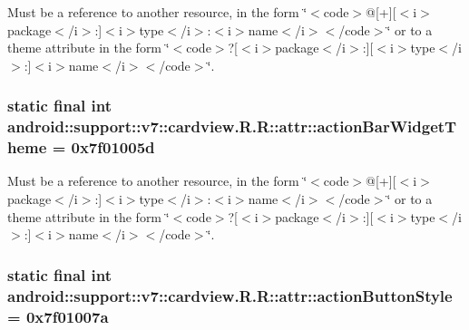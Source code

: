 Must be a reference to another resource, in the form \char`\"{}$<$code$>$@\mbox{[}+\mbox{]}\mbox{[}$<$i$>$package$<$/i$>$:\mbox{]}$<$i$>$type$<$/i$>$:$<$i$>$name$<$/i$>$$<$/code$>$\char`\"{} or to a theme attribute in the form \char`\"{}$<$code$>$?\mbox{[}$<$i$>$package$<$/i$>$:\mbox{]}\mbox{[}$<$i$>$type$<$/i$>$:\mbox{]}$<$i$>$name$<$/i$>$$<$/code$>$\char`\"{}. \hypertarget{classandroid_1_1support_1_1v7_1_1cardview_1_1_r_1_1attr_2e445c2e571511680877e733ec1be802}{
\subsubsection[{actionBarWidgetTheme}]{\setlength{\rightskip}{0pt plus 5cm}static final int android::support::v7::cardview.R.R::attr::actionBarWidgetTheme = 0x7f01005d}}
\label{classandroid_1_1support_1_1v7_1_1cardview_1_1_r_1_1attr_2e445c2e571511680877e733ec1be802}


Must be a reference to another resource, in the form \char`\"{}$<$code$>$@\mbox{[}+\mbox{]}\mbox{[}$<$i$>$package$<$/i$>$:\mbox{]}$<$i$>$type$<$/i$>$:$<$i$>$name$<$/i$>$$<$/code$>$\char`\"{} or to a theme attribute in the form \char`\"{}$<$code$>$?\mbox{[}$<$i$>$package$<$/i$>$:\mbox{]}\mbox{[}$<$i$>$type$<$/i$>$:\mbox{]}$<$i$>$name$<$/i$>$$<$/code$>$\char`\"{}. \hypertarget{classandroid_1_1support_1_1v7_1_1cardview_1_1_r_1_1attr_e042c6d3b09b37c077a5277a380beefb}{
\subsubsection[{actionButtonStyle}]{\setlength{\rightskip}{0pt plus 5cm}static final int android::support::v7::cardview.R.R::attr::actionButtonStyle = 0x7f01007a}}
\label{classandroid_1_1support_1_1v7_1_1cardview_1_1_r_1_1attr_e042c6d3b09b37c077a5277a380beefb}


